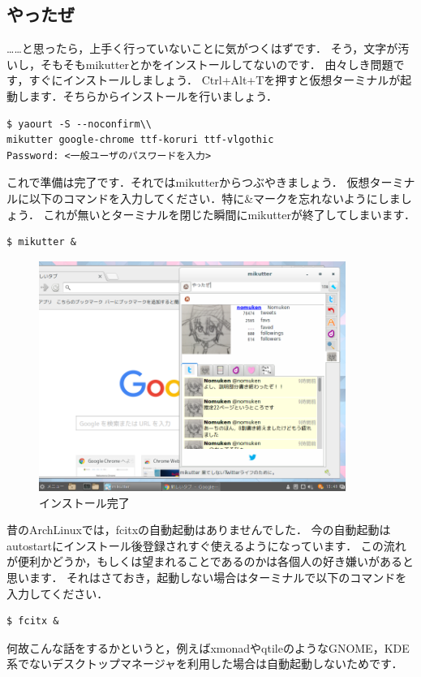 \documentclass[b5j,twoside,openany]{jsbook}
\begin{document}
  \subsection{やったぜ}
    ……と思ったら，上手く行っていないことに気がつくはずです．
    そう，文字が汚いし，そもそもmikutterとかをインストールしてないのです．
    由々しき問題です，すぐにインストールしましょう．
    Ctrl+Alt+Tを押すと仮想ターミナルが起動します．そちらからインストールを行いましょう．
    \begin{screen}
\begin{verbatim}
$ yaourt -S --noconfirm\\
mikutter google-chrome ttf-koruri ttf-vlgothic
Password: <一般ユーザのパスワードを入力>
\end{verbatim}
    \end{screen}
    これで準備は完了です．それではmikutterからつぶやきましょう．
    仮想ターミナルに以下のコマンドを入力してください．特に\&マークを忘れないようにしましょう．
    これが無いとターミナルを閉じた瞬間にmikutterが終了してしまいます．
    \begin{screen}
\begin{verbatim}
$ mikutter &
\end{verbatim}
    \end{screen}
    \begin{figure}[h!p]
      \begin{center}
        \includegraphics[width=100mm]{images/iyh.png}
      \end{center}
      \caption{インストール完了}
      \label{iyh}
    \end{figure}
    \begin{boxnote}
      昔のArchLinuxでは，fcitxの自動起動はありませんでした．
      今の自動起動はautostartにインストール後登録されすぐ使えるようになっています．
      この流れが便利かどうか，もしくは望まれることであるのかは各個人の好き嫌いがあると思います．
      それはさておき，起動しない場合はターミナルで以下のコマンドを入力してください．
      \begin{screen}
\begin{verbatim}
$ fcitx &
\end{verbatim}
      \end{screen}
      何故こんな話をするかというと，例えばxmonadやqtileのようなGNOME，KDE系でないデスクトップマネージャを利用した場合は自動起動しないためです．
    \end{boxnote}
\end{document}
